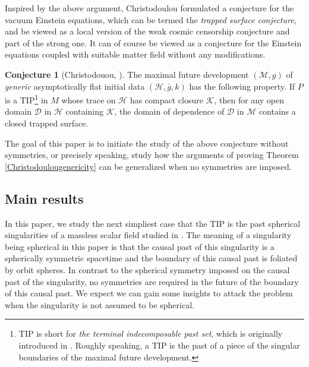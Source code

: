 \documentclass[11pt,reqno]{amsart}
\theoremstyle{definition}
\newtheorem*{conjecture}{Conjecture}
\numberwithin{equation}{section}
\begin{document}
Inspired by the above argument, Christodoulou formulated a conjecture \cite{Chr99cqg} for the vacuum Einstein equations, which can be termed the \emph{trapped surface conjecture}, and be viewed as a local version of the weak cosmic censorship conjecture and part of the strong one. It can of course be viewed as a conjecture for the Einstein equations coupled with suitable matter field without any modifications.
\begin{conjecture}[Christodouou, \cite{Chr99cqg}]\label{conjecture}
The maximal future development $(\mathcal{M},g)$ of \emph{generic} asymptotically flat initial data $(\mathcal{H}, \bar{g}, k)$ has the following property. If $P$ is a TIP\footnote{TIP is short for \emph{the terminal indecomposable past set}, which is originally introduced in \cite{G-K-P}. Roughly speaking, a TIP is the past of a piece of the singular boundaries of the maximal future development.}  in $M$ whose trace on $\mathcal{H}$ has compact closure $\mathcal{K}$, then for any open domain $\mathcal{D}$ in $\mathcal{H}$ containing $\mathcal{K}$, the domain of dependence of $\mathcal{D}$ in $\mathcal{M}$ contains a closed trapped surface.
\end{conjecture}
The goal of this paper is to initiate the study of the above conjecture without symmetries, or precisely speaking, study how the arguments of proving Theorem \ref{Christodoulougenericity} can be generalized when no symmetries are imposed.
\subsection{Main results}
 In this paper, we study the next simpliest case that the TIP is the past spherical singularities of a massless scalar field studied in \cite{Chr99}. The meaning of a singularity being spherical in this paper is that the causal past of this singularity is a spherically symmetric spacetime and the boundary of this causal past is foliated by orbit spheres. In contrast to the spherical symmetry imposed on the causal past of the singularity, no symmetries are required in the future of the boundary of this causal past. We expect we can gain some insights to attack the problem when the singularity is not assumed to be spherical.
\end{document}
